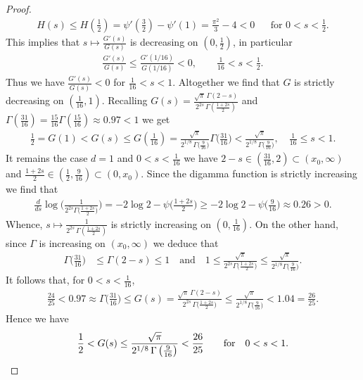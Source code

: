 \documentclass[12pt, reqno]{amsart}%
\theoremstyle{plain}  %
\theoremstyle{definition}  %
\theoremstyle{remark}
\numberwithin{equation}{section}
\begin{document}
\begin{proof}
\begin{align*}
H(s)\leq H(\tfrac12)=\psi'(\frac{3}{2})- \psi'(1)= \frac{\pi^2}{3} - 4<0&& \text{for $0<s<\frac{1}{2}$}.
\end{align*}
This implies that $s\mapsto \frac{G'(s)}{G(s)}$ is decreasing on $(0,\frac{1}{2})$, in particular
\begin{align*}
 \frac{G'(s)}{G(s)}\leq  \frac{G'(1/16)}{G(1/16)}<0,\qquad \frac{1}{16}<s<\frac{1}{2}.
\end{align*}
Thus we have  $\frac{G'(s)}{G(s)}<0$ for  $\frac{1}{16}<s<1$. Altogether we find that $G$ is strictly decreasing on $(\frac{1}{16},1)$. Recalling $G(s)= \frac{\sqrt{\pi}\,\Gamma(2-s)}{2^{2s}\,\Gamma\!\left(\frac{1+2s}{2}\right)}$ and $\Gamma\left(\tfrac{31}{16}\right)= \tfrac{15}{16}\Gamma\left(\tfrac{15}{16}\right)\approx 0.97<1$  we get
\begin{align*}
\frac{1}{2}=G(1)<G(s)\leq G(\frac{1}{16})= \frac{\sqrt{\pi}}
{2^{1/8}\,\Gamma\big(\frac{9}{16}\big)} \Gamma\big(\frac{31}{16}\big) <\frac{\sqrt{\pi}}
{2^{1/8}\,\Gamma\big(\frac{9}{16}\big)}, \quad\text{$\frac{1}{16}\leq s<1$}.
\end{align*}
 It remains  the case $d=1$ and $0<s<\tfrac{1}{16}$
we have $2-s \in (\tfrac{31}{16},2) \subset (x_0,\infty)$ and $\tfrac{1+2s}{2} \in (\tfrac12,\tfrac{9}{16}) \subset (0,x_0).$
Since the digamma function is strictly increasing we find that
\begin{align*}
\frac{d}{d s} \log \Big( \frac{1}{2^{2s}\Gamma\big(\frac{1+2s}{2}\big)} \Big)
= -2\log 2 -\psi\big(\tfrac{1+2s}{2}\big)
\geq -2\log 2 -\psi\big(\frac{9}{16}\big)\approx 0.26>0.
\end{align*}
 Whence,  $s \mapsto \frac{1}{2^{2s}\,\Gamma\!\left(\frac{1+2s}{2}\right)}$
is strictly increasing on $ (0,\tfrac{1}{16}).$ On the other hand, since $\Gamma$ is  increasing on $(x_0,\infty)$ we deduce that
\begin{align*}
\Gamma\Big(\frac{31}{16}\Big) &\leq\Gamma(2-s) \leq 1\quad \text{and}\quad
1 \leq \frac{\sqrt{\pi}}{2^{2s}\Gamma\Big(\frac{1+2s}{2}\Big)} \leq \frac{\sqrt{\pi}}{2^{1/8}\Gamma\Big(\frac{9}{16}\Big)}.
\end{align*}
It follows that, for $0<s<\frac{1}{16}$,
\begin{align*}
\frac{24}{25}<0.97\approx  \Gamma\Big(\frac{31}{16}\Big)
\leq G(s)
= \frac{\sqrt{\pi}\,\Gamma(2-s)}{2^{2s}\,\Gamma\big(\tfrac{1+2s}{2}\big)}
\leq \frac{\sqrt{\pi}}{ 2^{1/8}\Gamma\big(\tfrac{9}{16}\big)}< 1.04 =\frac{26}{25}.
\end{align*}
Hence we have
\begin{align*}
\frac{1}{2}<G(s)\leq  \frac{\sqrt{\pi}}
{2^{1/8}\,\Gamma\left(\frac{9}{16}\right)}<\frac{26}{25} \qquad\text{for \,\, $0<s<1$}.
\end{align*}
\end{proof}
\end{document}

